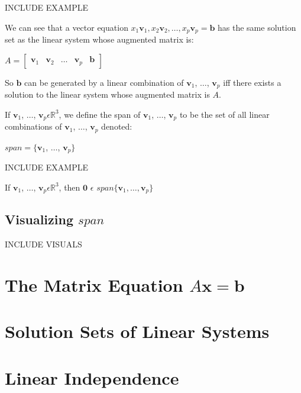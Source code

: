 \documentclass{report}
\begin{document}
\begin{center}
	INCLUDE EXAMPLE
\end{center}
We can see that a vector equation $x_1\mathbf{v}_1,x_2\mathbf{v}_2, \ldots ,x_p\mathbf{v}_p = \mathbf{b}$ has the same solution set as the linear system whose augmented matrix is:
\begin{center}
	 $A = \begin{bmatrix} \mathbf{v}_1 & \mathbf{v}_2 & \ldots & \mathbf{v}_p & \mathbf{b} \end{bmatrix}$
\end{center}
So $\mathbf{b}$ can be generated by a linear combination of $\mathbf{v}_1$, $\ldots$, $\mathbf{v}_p$ iff there exists a solution to the linear system whose augmented matrix is $A$.
\begin{definition}
	If $\mathbf{v}_1$, $\ldots$, $\mathbf{v}_p \epsilon \mathbb{R}^3$, we define the span of $\mathbf{v}_1$, $\ldots$, $\mathbf{v}_p$ to be the set of all linear combinations of $\mathbf{v}_1$, $\ldots$, $\mathbf{v}_p$ denoted:
	\begin{center}
		$span=\{ \mathbf{v}_1$, $\ldots$, $\mathbf{v}_p\}$
	\end{center}
\end{definition}
\begin{center}
	INCLUDE EXAMPLE
\end{center}
\begin{theorem}
	If $\mathbf{v}_1$, $\ldots$, $\mathbf{v}_p \epsilon \mathbb{R}^3$, then $\mathbf{0}$ $\epsilon$ $span\{ \mathbf{v}_1, \ldots, \mathbf{v}_p\}$
\end{theorem}
\subsection*{Visualizing $span$}
\begin{center}
	INCLUDE VISUALS
\end{center}
\section{The Matrix Equation $A\mathbf{x}=\mathbf{b}$}
\begin{definition}
	
\end{definition}
\section{Solution Sets of Linear Systems}
\section{Linear Independence}
\end{document}
